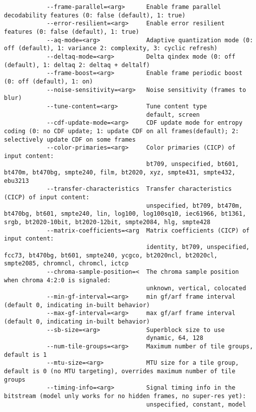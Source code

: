 \begin{appendices}
\begin{lstlisting}
            --frame-parallel=<arg>      Enable frame parallel decodability features (0: false (default), 1: true)
            --error-resilient=<arg>     Enable error resilient features (0: false (default), 1: true)
            --aq-mode=<arg>             Adaptive quantization mode (0: off (default), 1: variance 2: complexity, 3: cyclic refresh)
            --deltaq-mode=<arg>         Delta qindex mode (0: off (default), 1: deltaq 2: deltaq + deltalf)
            --frame-boost=<arg>         Enable frame periodic boost (0: off (default), 1: on)
            --noise-sensitivity=<arg>   Noise sensitivity (frames to blur)
            --tune-content=<arg>        Tune content type
                                        default, screen
            --cdf-update-mode=<arg>     CDF update mode for entropy coding (0: no CDF update; 1: update CDF on all frames(default); 2: selectively update CDF on some frames
            --color-primaries=<arg>     Color primaries (CICP) of input content:
                                        bt709, unspecified, bt601, bt470m, bt470bg, smpte240, film, bt2020, xyz, smpte431, smpte432, ebu3213
            --transfer-characteristics  Transfer characteristics (CICP) of input content:
                                        unspecified, bt709, bt470m, bt470bg, bt601, smpte240, lin, log100, log100sq10, iec61966, bt1361, srgb, bt2020-10bit, bt2020-12bit, smpte2084, hlg, smpte428
            --matrix-coefficients=<arg  Matrix coefficients (CICP) of input content:
                                        identity, bt709, unspecified, fcc73, bt470bg, bt601, smpte240, ycgco, bt2020ncl, bt2020cl, smpte2085, chromncl, chromcl, ictcp
            --chroma-sample-position=<  The chroma sample position when chroma 4:2:0 is signaled:
                                        unknown, vertical, colocated
            --min-gf-interval=<arg>     min gf/arf frame interval (default 0, indicating in-built behavior)
            --max-gf-interval=<arg>     max gf/arf frame interval (default 0, indicating in-built behavior)
            --sb-size=<arg>             Superblock size to use
                                        dynamic, 64, 128
            --num-tile-groups=<arg>     Maximum number of tile groups, default is 1
            --mtu-size=<arg>            MTU size for a tile group, default is 0 (no MTU targeting), overrides maximum number of tile groups
            --timing-info=<arg>         Signal timing info in the bitstream (model unly works for no hidden frames, no super-res yet):
                                        unspecified, constant, model

\end{lstlisting}
\end{appendices}
